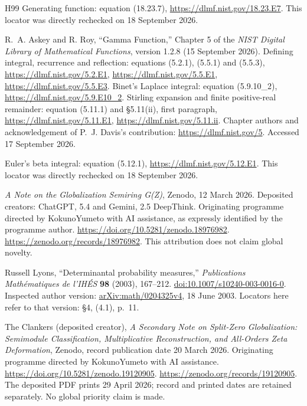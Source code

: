 \documentclass[11pt,a4paper]{article}
\begin{document}
\begin{thebibliography}{H99}
Generating function: equation (18.23.7),
\url{https://dlmf.nist.gov/18.23.E7}.
This locator was directly rechecked on 18 September 2026.

R.~A. Askey and R. Roy,
``Gamma Function,'' Chapter 5 of the
\emph{NIST Digital Library of Mathematical Functions},
version 1.2.8 (15 September 2026).
Defining integral, recurrence and reflection:
equations (5.2.1), (5.5.1) and (5.5.3),
\url{https://dlmf.nist.gov/5.2.E1},
\url{https://dlmf.nist.gov/5.5.E1},
\url{https://dlmf.nist.gov/5.5.E3}.
Binet's Laplace integral: equation (5.9.10\_2),
\url{https://dlmf.nist.gov/5.9.E10_2}.
Stirling expansion and finite positive-real remainder:
equation (5.11.1) and \S5.11(ii), first paragraph,
\url{https://dlmf.nist.gov/5.11.E1},
\url{https://dlmf.nist.gov/5.11.ii}.
Chapter authors and acknowledgement of P.~J. Davis's contribution:
\url{https://dlmf.nist.gov/5}.
Accessed 17 September 2026.

Euler's beta integral: equation (5.12.1),
\url{https://dlmf.nist.gov/5.12.E1}.
This locator was directly rechecked on 18 September 2026.

\emph{A Note on the Globalization Semiring G(Z)}, Zenodo,
12 March 2026. Deposited creators: ChatGPT, 5.4 and Gemini, 2.5 DeepThink.
Originating programme directed by KokunoYumeto with AI assistance,
as expressly identified by the programme author.
\url{https://doi.org/10.5281/zenodo.18976982}.
\url{https://zenodo.org/records/18976982}.
This attribution does not claim global novelty.


Russell Lyons, ``Determinantal probability measures,''
\emph{Publications Math\'ematiques de l'IH\'ES} \textbf{98} (2003), 167--212.
\href{https://doi.org/10.1007/s10240-003-0016-0}{doi:10.1007/s10240-003-0016-0}.
Inspected author version: \href{https://arxiv.org/abs/math/0204325v4}{arXiv:math/0204325v4},
18 June 2003. Locators here refer to that version: \S4, (4.1), p.~11.


The Clankers (deposited creator), \emph{A Secondary Note on Split-Zero
Globalization: Semimodule Classification, Multiplicative Reconstruction,
and All-Orders Zeta Deformation}, Zenodo, record publication date
20 March 2026. Originating programme directed by KokunoYumeto
with AI assistance. \url{https://doi.org/10.5281/zenodo.19120905}.
\url{https://zenodo.org/records/19120905}.
The deposited PDF prints 29 April 2026; record and printed dates
are retained separately. No global priority claim is made.



\end{thebibliography}
\end{document}
